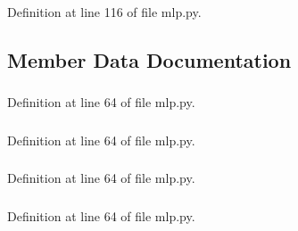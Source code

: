 Definition at line 116 of file mlp.py.



\subsection{Member Data Documentation}
\hypertarget{classmlp_1_1mlp_aab9e6c1e9b3661fa3f276d09baf27144}{
\subsubsection[{allpercent}]{}}
\label{classmlp_1_1mlp_aab9e6c1e9b3661fa3f276d09baf27144}


Definition at line 64 of file mlp.py.

\hypertarget{classmlp_1_1mlp_a2f75a4b3429e0307568fc45d7e6950da}{
\subsubsection[{beta}]{}}
\label{classmlp_1_1mlp_a2f75a4b3429e0307568fc45d7e6950da}


Definition at line 64 of file mlp.py.

\hypertarget{classmlp_1_1mlp_ae97e72b20c044203c2a86adc234eb9c5}{
\subsubsection[{classes}]{}}
\label{classmlp_1_1mlp_ae97e72b20c044203c2a86adc234eb9c5}


Definition at line 64 of file mlp.py.

\hypertarget{classmlp_1_1mlp_a0573cbd708236e8af5fb46edc9c36660}{
\subsubsection[{cm}]{}}
\label{classmlp_1_1mlp_a0573cbd708236e8af5fb46edc9c36660}


Definition at line 64 of file mlp.py.

